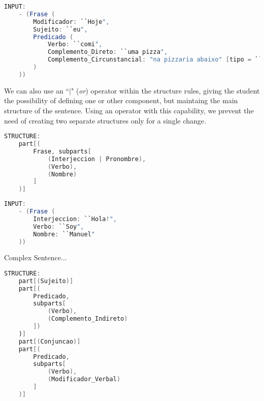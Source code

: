 \begin{center}
\begin{minipage}{15cm}
\begin{lstlisting}[language=java, basicstyle=\small, label={lst:example_input3}, caption=Example of a sentence input]
INPUT:
    - (Frase (
        Modificador: ``Hoje",
        Sujeito: ``eu",
        Predicado (
            Verbo: ``comi",
            Complemento_Direto: ``uma pizza",
            Complemento_Circunstancial: "na pizzaria abaixo" [tipo = ``lugar"]
        )
    ))
\end{lstlisting}
\end{minipage}
\end{center}


We can also use an ``\emph{\(|\)}" (\textit{or}) operator within the structure rules, giving the student the possibility of defining one or other component,
but maintaing the main structure of the sentence. 
Using an operator with this capability, we prevent the need of creating two separate structures only for a single change. 

\begin{center}
\begin{minipage}{15cm}
\begin{lstlisting}[language=java, basicstyle=\small, label={lst:example_structure4}, caption=Example of a sentence structure]
STRUCTURE:
    part[(
        Frase, subparts[
            (Interjeccion | Pronombre),
            (Verbo),
            (Nombre)
        ]
    )]
\end{lstlisting}
\end{minipage}
\end{center}

\begin{center}
\begin{minipage}{15cm}
\begin{lstlisting}[language=java, basicstyle=\small, label={lst:example_input4}, caption=Example of a sentence input]
INPUT:
    - (Frase (
        Interjeccion: ``Hola!",
        Verbo: ``Soy",
        Nombre: ``Manuel"
    ))
\end{lstlisting}
\end{minipage}
\end{center}


Complex Sentence...

\begin{center}
\begin{minipage}{14cm}
\begin{lstlisting}[language=java, basicstyle=\small, label={lst:example_complex_structure}, caption=Example of a complex sentence structure]
STRUCTURE:
    part[(Sujeito)]
    part[(
        Predicado,
        subparts[
            (Verbo),
            (Complemento_Indireto)
        ])
    )]
    part[(Conjuncao)]
	part[(
        Predicado,
        subparts[
            (Verbo),
            (Modificador_Verbal)
        ]
    )]
\end{lstlisting}
\end{minipage}
\end{center}


